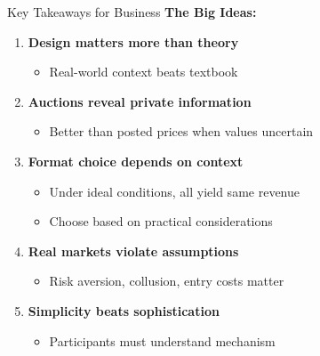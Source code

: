\documentclass[xcolor={x11names}, aspectratio=169 ]{beamer}
\begin{document}
\begin{frame}{Key Takeaways for Business}
\textbf{The Big Ideas:}

\begin{enumerate}
  \item \textbf{Design matters more than theory}
  \begin{itemize}
    \item Real-world context beats textbook
  \end{itemize}
  
  \item \textbf{Auctions reveal private information}
  \begin{itemize}
    \item Better than posted prices when values uncertain
  \end{itemize}
  
  \item \textbf{Format choice depends on context}
  \begin{itemize}
    \item Under ideal conditions, all yield same revenue
    \item Choose based on practical considerations
  \end{itemize}
  
  \item \textbf{Real markets violate assumptions}
  \begin{itemize}
    \item Risk aversion, collusion, entry costs matter
  \end{itemize}
  
  \item \textbf{Simplicity beats sophistication}
  \begin{itemize}
    \item Participants must understand mechanism
  \end{itemize}
\end{enumerate}
\end{frame}
\end{document}
